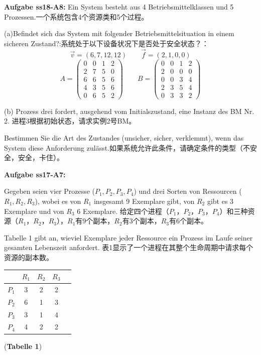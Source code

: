 \documentclass[fleqn]{article}
\begin{document}
\noindent\textbf{Aufgabe ss18-A8:} Ein System besteht aus 4 Betriebsmittelklassen und 5 Prozessen.一个系统包含4个资源类和5个过程。

(a)Befindet sich das System mit folgender Betriebsmittelsituation in einem sicheren Zustand?:系统处于以下设备状况下是否处于安全状态？：
$$\vec{v}=(6,7,12,12)\qquad \vec{f}=(2,1,0,0)$$
$$A=\begin{pmatrix}
    0&0&1&2\\
    2&7&5&0\\
    6&6&5&6\\
    4&3&5&6\\
    0&6&5&2
\end{pmatrix}\qquad
B=\begin{pmatrix}
    0&0&1&2\\
    2&0&0&0\\
    0&0&3&4\\
    2&3&5&4\\
    0&3&3&2
\end{pmatrix}$$

(b) Prozess drei fordert, ausgehend vom Initialszustand, eine Instanz des BM Nr. 2. 进程3根据初始状态，请求实例2号BM。

\indent Bestimmen Sie die Art des Zustandes (unsicher, sicher, verklemmt), wenn das System diese Anforderung zulässt.如果系统允许此条件，请确定条件的类型（不安全，安全，卡住）。

\noindent\textbf{Aufgabe ss17-A7:}

Gegeben seien vier Prozesse ($P_1, P_2, P_3, P_4$) und drei Sorten von Ressourcen ($R_1, R_2, R_3$), 
wobei es von $R_1$ insgesamt 9 Exemplare gibt, von $R_2$ gibt es 3 Exemplare und von $R_3$ 6 Exemplare.
给定四个进程（$ P_1，P_2，P_3，P_4 $）和三种资源（$ R_1，R_2，R_3 $），$ R_1 $有9个副本，$ R_2 $有3个副本，$ R_3 $有6个副本。

Tabelle 1 gibt an, wieviel Exemplare jeder Ressource ein Prozess im Laufe seiner gesamten Lebenszeit anfordert.
表1显示了一个进程在其整个生命周期中请求每个资源的副本数。

\begin{center}
    \begin{tabular}{c|cccc}
        &$R_1$&$R_2$&$R_3$&\\
        \hline
        $P_1$&3&2&2\\
        $P_2$&6&1&3\\
        $P_3$&3&1&4\\
        $P_4$&4&2&2\\
    \end{tabular}\qquad (\textbf{Tabelle 1})
\end{center}
\end{document}
